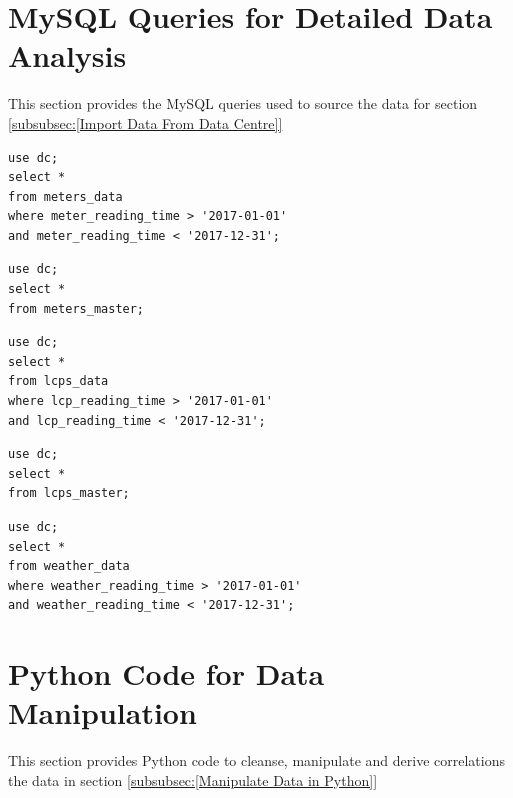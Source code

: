 \documentclass[12pt]{scrartcl}
\begin{document}
\section{MySQL Queries for Detailed Data Analysis}
\label{sec:[Detailed MySQL Queries]}
This section provides the MySQL queries used to source the data for section \ref{subsubsec:[Import Data From Data Centre]}

\begin{lstlisting}[frame=single,basicstyle=\footnotesize\ttfamily,
  caption={MySQL Query for Energy Consumption in 2017},label={list:[Energy Consumption in 2017]}]
use dc; 
select * 
from meters_data
where meter_reading_time > '2017-01-01'
and meter_reading_time < '2017-12-31';
\end{lstlisting}

\begin{lstlisting}[frame=single,basicstyle=\footnotesize\ttfamily,
  caption={MySQL Query for All Meter ID Location},label={list:[All Meter ID Location]}]
use dc; 
select * 
from meters_master;
\end{lstlisting}

\begin{lstlisting}[frame=single,basicstyle=\footnotesize\ttfamily,
  caption={MySQL Query for LCP information for 2017},label={list:[LCP information for 2017]}]
use dc; 
select * 
from lcps_data
where lcp_reading_time > '2017-01-01'
and lcp_reading_time < '2017-12-31';
\end{lstlisting}

\begin{lstlisting}[frame=single,basicstyle=\footnotesize\ttfamily,
  caption={MySQL Query for LCP Location Information},label={list:[LCP Location Information]}]
use dc; 
select * 
from lcps_master;
\end{lstlisting}

\begin{lstlisting}[frame=single,basicstyle=\footnotesize\ttfamily,
  caption={MySQL Query for Weather Data for 2017},label={list:[Weather Data for 2017]}]
use dc; 
select * 
from weather_data
where weather_reading_time > '2017-01-01'
and weather_reading_time < '2017-12-31';
\end{lstlisting}

\section{Python Code for Data Manipulation}
\label{sec:[Python Code]}
This section provides Python code to cleanse, manipulate and derive correlations the data in section \ref{subsubsec:[Manipulate Data in Python]}
\end{document}
